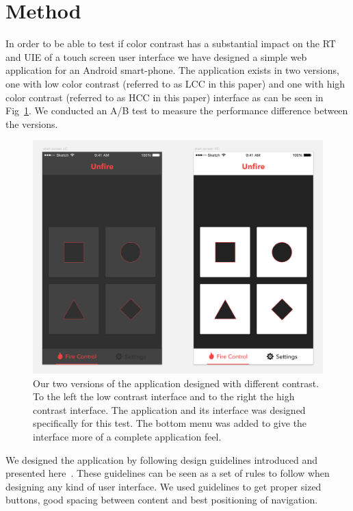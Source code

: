 \documentclass[runningheads,a4paper]{llncs}
\begin{document}
\section{Method}
In order to be able to test if color contrast has a substantial impact on the RT and UIE of a touch screen user interface we have designed a simple web application for an Android smart-phone. The application exists in two versions, one with low color contrast (referred to as LCC in this paper) and one with high color contrast (referred to as HCC in this paper) interface as can be seen in Fig~\ref{fig:application}. We conducted an A/B test to measure the performance difference between the versions.

\begin{figure}
	\centering
	\includegraphics[width=\textwidth]{application}
	\caption{Our two versions of the application designed with different contrast. To the left the low contrast interface and to the right the high contrast interface. The application and its interface was designed specifically for this test. The bottom menu was added to give the interface more of a complete application feel. 
	\label{fig:application}}
\end{figure}

We designed the application by following design guidelines introduced and presented here~\cite{hoober2011designing,johnson2013designing,gong2004guidelines,norman2013design}. These guidelines can be seen as a set of rules to follow when designing any kind of user interface. We used guidelines to get proper sized buttons, good spacing between content and best positioning of navigation.
\end{document}
